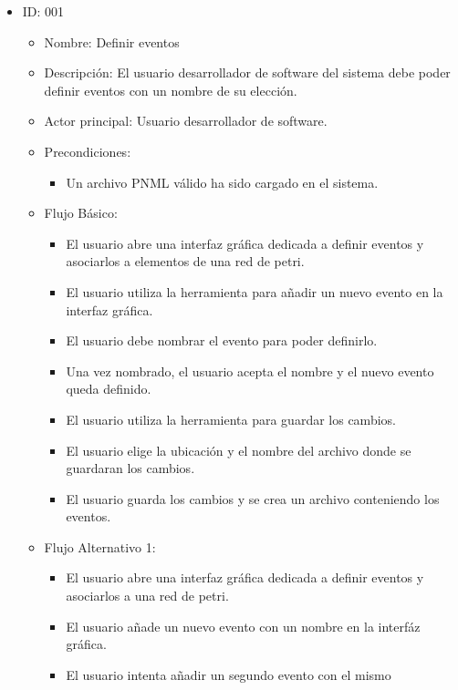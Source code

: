 \begin{itemize}
    \item ID: 001
    \begin{itemize}
        \item Nombre: Definir eventos
        \item Descripción: El usuario desarrollador de software del sistema debe
        poder definir eventos con un nombre de su elección.
       	\item Actor principal: Usuario desarrollador de software.
       	\item Precondiciones: 
       		\begin{itemize}
       		    \item Un archivo PNML válido ha sido cargado en el sistema.
   		    \end{itemize}
       	\item Flujo Básico: 
       		\begin{itemize}
       		    \item El usuario abre una interfaz gráfica dedicada a definir
       		    eventos y asociarlos a elementos de una red de petri.
       		    \item El usuario utiliza la herramienta para añadir un nuevo
       		    evento en la interfaz gráfica.
       		    \item El usuario debe nombrar el evento para poder definirlo. 
       		    \item Una vez nombrado, el usuario acepta el nombre y el nuevo
       		    evento queda definido.
       		    \item El usuario utiliza la herramienta para guardar los cambios.
       		    \item El usuario elige la ubicación y el nombre del archivo donde
       		    se guardaran los cambios.
       		    \item El usuario guarda los cambios y se crea un archivo
       		    conteniendo los eventos.
   		    \end{itemize}
	    \item Flujo Alternativo 1: 
           	\begin{itemize}
       		    \item El usuario abre una interfaz gráfica dedicada a definir
       		    eventos y asociarlos a una red de petri.
       		    \item El usuario añade un nuevo evento con un nombre en la interfáz
       		    gráfica.
       		    \item El usuario intenta añadir un segundo evento con el mismo

\end{itemize}
\end{itemize}
\end{itemize}

